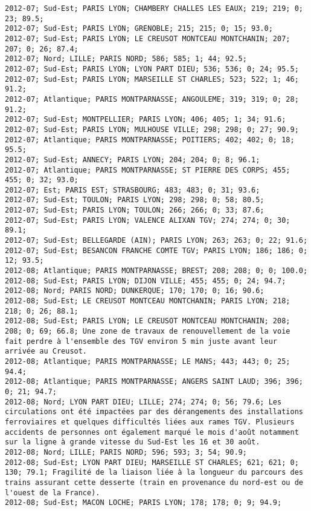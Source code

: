 \documentclass{article}
\begin{document}
\begin{Verbatim}[commandchars=\\\{\}]
2012-07; Sud-Est; PARIS LYON; CHAMBERY CHALLES LES EAUX; 219; 219; 0; 23; 89.5; 
2012-07; Sud-Est; PARIS LYON; GRENOBLE; 215; 215; 0; 15; 93.0; 
2012-07; Sud-Est; PARIS LYON; LE CREUSOT MONTCEAU MONTCHANIN; 207; 207; 0; 26; 87.4; 
2012-07; Nord; LILLE; PARIS NORD; 586; 585; 1; 44; 92.5; 
2012-07; Sud-Est; PARIS LYON; LYON PART DIEU; 536; 536; 0; 24; 95.5; 
2012-07; Sud-Est; PARIS LYON; MARSEILLE ST CHARLES; 523; 522; 1; 46; 91.2; 
2012-07; Atlantique; PARIS MONTPARNASSE; ANGOULEME; 319; 319; 0; 28; 91.2; 
2012-07; Sud-Est; MONTPELLIER; PARIS LYON; 406; 405; 1; 34; 91.6; 
2012-07; Sud-Est; PARIS LYON; MULHOUSE VILLE; 298; 298; 0; 27; 90.9; 
2012-07; Atlantique; PARIS MONTPARNASSE; POITIERS; 402; 402; 0; 18; 95.5; 
2012-07; Sud-Est; ANNECY; PARIS LYON; 204; 204; 0; 8; 96.1; 
2012-07; Atlantique; PARIS MONTPARNASSE; ST PIERRE DES CORPS; 455; 455; 0; 32; 93.0; 
2012-07; Est; PARIS EST; STRASBOURG; 483; 483; 0; 31; 93.6; 
2012-07; Sud-Est; TOULON; PARIS LYON; 298; 298; 0; 58; 80.5; 
2012-07; Sud-Est; PARIS LYON; TOULON; 266; 266; 0; 33; 87.6; 
2012-07; Sud-Est; PARIS LYON; VALENCE ALIXAN TGV; 274; 274; 0; 30; 89.1; 
2012-07; Sud-Est; BELLEGARDE (AIN); PARIS LYON; 263; 263; 0; 22; 91.6; 
2012-07; Sud-Est; BESANCON FRANCHE COMTE TGV; PARIS LYON; 186; 186; 0; 12; 93.5; 
2012-08; Atlantique; PARIS MONTPARNASSE; BREST; 208; 208; 0; 0; 100.0; 
2012-08; Sud-Est; PARIS LYON; DIJON VILLE; 455; 455; 0; 24; 94.7; 
2012-08; Nord; PARIS NORD; DUNKERQUE; 170; 170; 0; 16; 90.6; 
2012-08; Sud-Est; LE CREUSOT MONTCEAU MONTCHANIN; PARIS LYON; 218; 218; 0; 26; 88.1; 
2012-08; Sud-Est; PARIS LYON; LE CREUSOT MONTCEAU MONTCHANIN; 208; 208; 0; 69; 66.8; Une zone de travaux de renouvellement de la voie fait perdre à l'ensemble des TGV environ 5 min juste avant leur arrivée au Creusot.
2012-08; Atlantique; PARIS MONTPARNASSE; LE MANS; 443; 443; 0; 25; 94.4; 
2012-08; Atlantique; PARIS MONTPARNASSE; ANGERS SAINT LAUD; 396; 396; 0; 21; 94.7; 
2012-08; Nord; LYON PART DIEU; LILLE; 274; 274; 0; 56; 79.6; Les circulations ont été impactées par des dérangements des installations ferroviaires et quelques difficultés liées aux rames TGV. Plusieurs accidents de personnes ont également marqué le mois d'août notamment sur la ligne à grande vitesse du Sud-Est les 16 et 30 août.
2012-08; Nord; LILLE; PARIS NORD; 596; 593; 3; 54; 90.9; 
2012-08; Sud-Est; LYON PART DIEU; MARSEILLE ST CHARLES; 621; 621; 0; 130; 79.1; Fragilité de la liaison liée à la longueur du parcours des trains assurant cette desserte (train en provenance du nord-est ou de l'ouest de la France).
2012-08; Sud-Est; MACON LOCHE; PARIS LYON; 178; 178; 0; 9; 94.9; 

\end{Verbatim}
\end{document}
